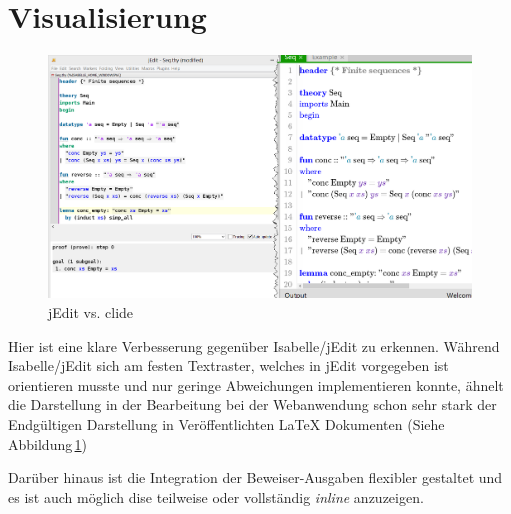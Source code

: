 \section{Visualisierung}

\begin{figure}[ht]
\includegraphics[width=\linewidth]{images/jedit}
  \caption{jEdit vs. clide}
  \label{fig:jedit}
\end{figure}

Hier ist eine klare Verbesserung gegenüber Isabelle/jEdit zu erkennen. Während Isabelle/jEdit sich
am festen Textraster, welches in jEdit vorgegeben ist orientieren musste und nur geringe
Abweichungen implementieren konnte, ähnelt die Darstellung in der Bearbeitung bei der Webanwendung
schon sehr stark der Endgültigen Darstellung in Veröffentlichten LaTeX Dokumenten (Siehe
Abbildung\,\ref{fig:jedit})

Darüber hinaus ist die Integration der Beweiser-Ausgaben flexibler gestaltet und es ist auch möglich
dise teilweise oder vollständig \textit{inline} anzuzeigen.